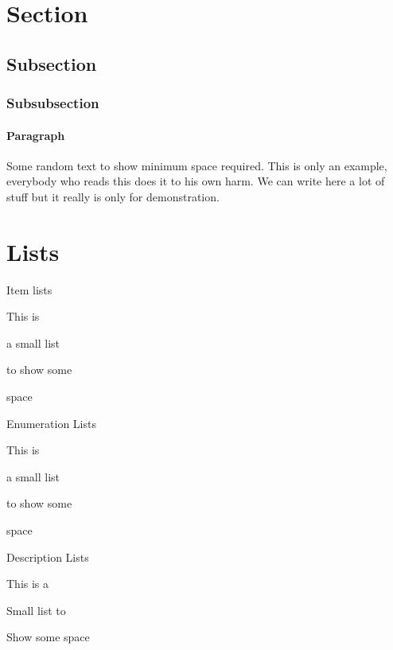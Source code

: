 \documentclass[a4paper]{article}
\begin{document}
\begin{multicols}{3}\scriptsize

    \section{Section}
    \subsection{Subsection}
    \subsubsection{Subsubsection}
    \paragraph{Paragraph}
    Some random text to show minimum space required. This is only an example, everybody who reads this does it to his own harm. We can write here a lot of stuff but it really is only for demonstration.

    \section{Lists}
    Item lists
    \begin{itemize*}
        \item This is
        \item a small list
        \item to show some
        \item space
    \end{itemize*}

    Enumeration Lists
    \begin{enumerate*}
        \item This is
        \item a small list
        \item to show some
        \item space
    \end{enumerate*}

    Description Lists
    \begin{enumerate*}
        \item[This] is a
        \item[Small] list to
        \item[Show] some space
    \end{enumerate*}


\end{multicols}
\end{document}
